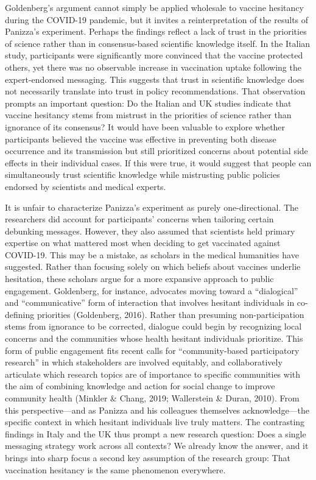 \documentclass[authordate, reflection,issue]{jote-new-article}
\begin{document}
	Goldenberg's argument cannot simply be applied wholesale to vaccine hesitancy during the COVID-19 pandemic, but it invites a reinterpretation of the results of Panizza's experiment. Perhaps the findings reflect a lack of trust in the priorities of science rather than in consensus-based scientific knowledge itself. In the Italian study, participants were significantly more convinced that the vaccine protected others, yet there was no observable increase in vaccination uptake following the expert-endorsed messaging. This suggests that trust in scientific knowledge does not necessarily translate into trust in policy recommendations. That observation prompts an important question: Do the Italian and UK studies indicate that vaccine hesitancy stems from mistrust in the priorities of science rather than ignorance of its consensus? It would have been valuable to explore whether participants believed the vaccine was effective in preventing both disease occurrence and its transmission but still prioritized concerns about potential side effects in their individual cases. If this were true, it would suggest that people can simultaneously trust scientific knowledge while mistrusting public policies endorsed by scientists and medical experts.







	It is unfair to characterize Panizza's experiment as purely one-directional. The researchers did account for participants' concerns when tailoring certain debunking messages. However, they also assumed that scientists held primary expertise on what mattered most when deciding to get vaccinated against COVID-19. This may be a mistake, as scholars in the medical humanities have suggested. Rather than focusing solely on which beliefs about vaccines underlie hesitation, these scholars argue for a more expansive approach to public engagement. Goldenberg, for instance, advocates moving toward a “dialogical” and “communicative” form of interaction that involves hesitant individuals in co-defining priorities (Goldenberg, 2016). Rather than presuming non-participation stems from ignorance to be corrected, dialogue could begin by recognizing local concerns and the communities whose health hesitant individuals prioritize. This form of public engagement fits recent calls for “community-based participatory research” in which stakeholders are involved equitably, and collaboratively articulate which research topics are of importance to specific communities with the aim of combining knowledge and action for social change to improve community health (Minkler \& Chang, 2019; Wallerstein \& Duran, 2010). From this perspective—and as Panizza and his colleagues themselves acknowledge—the specific context in which hesitant individuals live truly matters. The contrasting findings in Italy and the UK thus prompt a new research question: Does a single messaging strategy work across all contexts? We already know the answer, and it brings into sharp focus a second key assumption of the research group: That vaccination hesitancy is the same phenomenon everywhere.
\end{document}
